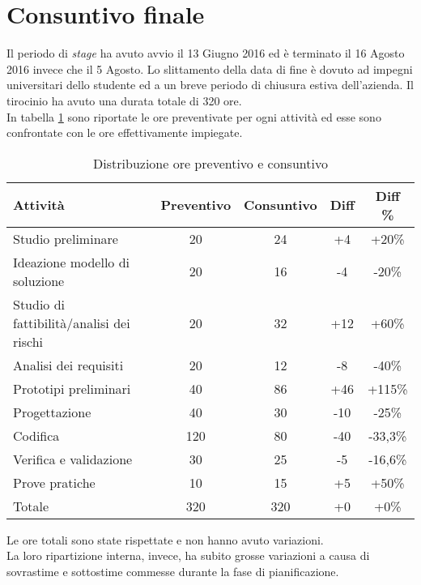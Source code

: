 \section{Consuntivo finale}
Il periodo di \emph{stage} ha avuto avvio il 13 Giugno 2016 ed è terminato il 16 Agosto 2016 invece che il 5 Agosto. Lo slittamento della data di fine è dovuto ad impegni universitari dello studente ed a un breve periodo di chiusura estiva dell'azienda. Il tirocinio ha avuto una durata totale di 320 ore.\\
In tabella \ref{tab:preventivo-consuntivo} sono riportate le ore preventivate per ogni attività ed esse sono confrontate con le ore effettivamente impiegate.
\begin{table}[H]
	\begin{center}
	  \begin{tabular}{| l | c | c | c | c |}
	    \hline
	    \textbf{Attività} & \textbf{Preventivo} & \textbf{Consuntivo} & \textbf{Diff} & \textbf{Diff \%} \\ \hline
	    Studio preliminare & 20 & 24 & +4 & +20\%\\
	    \hline
	    Ideazione modello di soluzione & 20 & 16 & -4 & -20\%\\
	    \hline
	    Studio di fattibilità/analisi dei rischi & 20 & 32 & +12 & +60\%\\
	    \hline
	    Analisi dei requisiti & 20 & 12 & -8 & -40\%\\
	    \hline
	    Prototipi preliminari & 40 & 86 & +46 & +115\%\\
	    \hline
	    Progettazione & 40 & 30 & -10 & -25\%\\
	    \hline
	    Codifica & 120 & 80 & -40 & -33,3\%\\
	    \hline
	    Verifica e validazione & 30 & 25 & -5 & -16,6\%\\
	    \hline
	    Prove pratiche & 10 & 15 & +5 & +50\%\\
	    \hline
	    Totale & 320 & 320 & +0 & +0\%\\
	    \hline
	  \end{tabular}
	\end{center}
	\caption{Distribuzione ore preventivo e consuntivo}\label{tab:preventivo-consuntivo}
\end{table}
Le ore totali sono state rispettate e non hanno avuto variazioni.\\
La loro ripartizione interna, invece, ha subito grosse variazioni a causa di sovrastime e sottostime commesse durante la fase di pianificazione.\\
